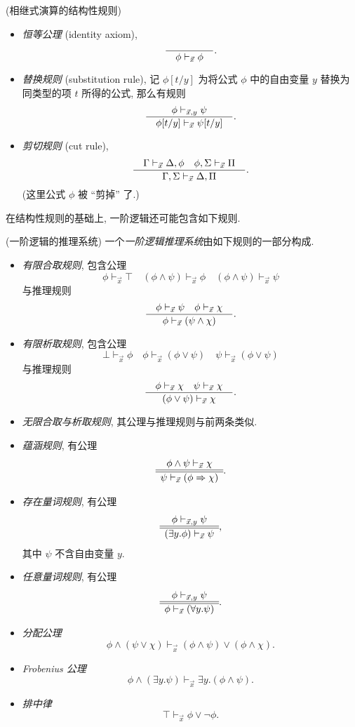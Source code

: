 \begin{definition}
	{(相继式演算的结构性规则)}
	\begin{itemize}
		\item \emph{恒等公理} (identity axiom),
		$$
		\frac{\quad  \quad}{\quad \phi\vdash_{\vec x} \phi \quad}.
		$$
		\item \emph{替换规则} (substitution rule),
		记 $\phi[t/y]$ 为将公式 $\phi$ 中的自由变量 $y$ 替换为同类型的项 $t$ 所得的公式, 那么有规则
		$$
		\frac{\quad \phi \vdash_{\vec x,y} \psi \quad}{\quad \phi[t/y]\vdash_{\vec x}\psi[t/y] \quad}.
		$$
		\item \emph{剪切规则} (cut rule),
		$$
		\frac{\quad 
			\Gamma \vdash_{\vec x} \Delta , \phi
			\quad
			\phi, \Sigma \vdash_{\vec x} \Pi 
		 \quad}{\quad 
			\Gamma,\Sigma \vdash_{\vec x} \Delta,\Pi
		 \quad}.
		$$
		(这里公式 $\phi$ 被 ``剪掉'' 了.)
	\end{itemize}
\end{definition}

在结构性规则的基础上, 一阶逻辑还可能包含如下规则.

\begin{definition}
	{(一阶逻辑的推理系统)}
	一个\emph{一阶逻辑推理系统}由如下规则的一部分构成.
	\begin{itemize}
		\item \emph{有限合取规则}, 包含公理
		$$
		\phi \vdash_{\vec x} \top
		\quad
		(\phi\wedge\psi)\vdash_{\vec x} \phi
		\quad
		(\phi\wedge\psi)\vdash_{\vec x} \psi
		$$
		与推理规则
		$$
		\frac{\quad \phi\vdash_{\vec x} \psi\quad \phi\vdash_{\vec x} \chi \quad}{\quad \phi\vdash_{\vec x} (\psi\wedge\chi) \quad}.
		$$
		\item \emph{有限析取规则}, 包含公理
		$$
		\bot \vdash_{\vec x} \phi
		\quad
		\phi \vdash_{\vec x} (\phi\vee\psi)
		\quad
		\psi \vdash_{\vec x} (\phi\vee\psi)
		$$
		与推理规则
		$$
		\frac{\quad \phi \vdash_{\vec x} \chi \quad \psi \vdash_{\vec x} \chi \quad}{\quad  (\phi\vee\psi)\vdash_{\vec x}\chi \quad}.
		$$
		\item \emph{无限合取与析取规则}, 其公理与推理规则与前两条类似.
		\item \emph{蕴涵规则}, 有公理
		$$
		\begin{array} {c} \phi\wedge\psi \vdash_{\vec x} \chi \\ \hline \hline \psi\vdash_{\vec x} (\phi\Rightarrow\chi) \end{array}.
		$$
		\item \emph{存在量词规则}, 有公理
		$$
		\begin{array} {c} \phi \vdash_{\vec x,y} \psi \\ \hline \hline (\exists y.\phi)\vdash_{\vec x} \psi \end{array},
		$$
		其中 $\psi$ 不含自由变量 $y$.
		\item \emph{任意量词规则}, 有公理
		$$
		\begin{array} {c} \phi \vdash_{\vec x,y} \psi \\ \hline \hline \phi\vdash_{\vec x} (\forall y.\psi) \end{array}.
		$$
		\item \emph{分配公理}
		$$
		\phi\wedge(\psi\vee\chi)\vdash_{\vec{x}}(\phi\wedge\psi)\vee(\phi\wedge\chi).
		$$
		\item \emph{Frobenius 公理}
		$$
		\phi\land(\exists y.\psi)\vdash_{\vec{x}}\exists y.(\phi\land\psi).
		$$
		\item \emph{排中律}
		$$
		\top\vdash_{\vec{x}}\phi\lor\neg\phi.
		$$
	\end{itemize}
\end{definition}

